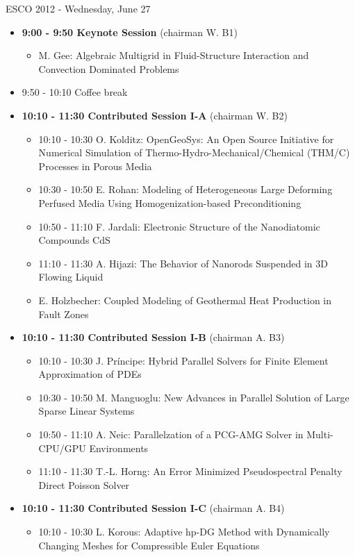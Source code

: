 \documentclass[10pt, A4]{article}%
\begin{document}
\newpage

\centerline{\huge ESCO 2012 - Wednesday, June 27}
\vspace{4mm}

\begin{itemize}    
  \item {\bf 9:00 - 9:50 Keynote Session} (chairman W. B1) 
  \begin{itemize}
    \item M. Gee: Algebraic Multigrid in Fluid-Structure Interaction and Convection Dominated Problems
  \end{itemize}
  \item 9:50 - 10:10 Coffee break
  \item {\bf 10:10 - 11:30 Contributed Session I-A} (chairman W. B2) 
  \begin{itemize}
    \item 10:10 - 10:30 O. Kolditz: OpenGeoSys: An Open Source Initiative for Numerical Simulation of Thermo-Hydro-Mechanical/Chemical (THM/C) Processes in Porous
Media
    \item 10:30 - 10:50 E. Rohan: Modeling of Heterogeneous Large Deforming Perfused Media Using Homogenization-based Preconditioning
    \item 10:50 - 11:10 F. Jardali: Electronic Structure of the Nanodiatomic Compounds CdS
    \item 11:10 - 11:30 A. Hijazi: The Behavior of Nanorods Suspended in 3D Flowing Liquid
	\item E. Holzbecher: Coupled Modeling of Geothermal Heat Production in Fault Zones
  \end{itemize}
  \item {\bf 10:10 - 11:30 Contributed Session I-B} (chairman A. B3) 
  \begin{itemize}
    \item 10:10 - 10:30 J. Pr\'{i}ncipe: Hybrid Parallel Solvers for Finite Element Approximation of PDEs
    \item 10:30 - 10:50 M. Manguoglu: New Advances in Parallel Solution of Large Sparse Linear Systems
    \item 10:50 - 11:10 A. Neic: Parallelzation of a PCG-AMG Solver in Multi-CPU/GPU Environments
    \item 11:10 - 11:30 T.-L. Horng: An Error Minimized Pseudospectral Penalty Direct Poisson Solver
  \end{itemize}
  \item {\bf 10:10 - 11:30 Contributed Session I-C} (chairman A. B4) 
  \begin{itemize}
    \item 10:10 - 10:30 L. Korous: Adaptive hp-DG Method with Dynamically Changing Meshes for
Compressible Euler Equations


\end{itemize}
\end{itemize}
\end{document}
